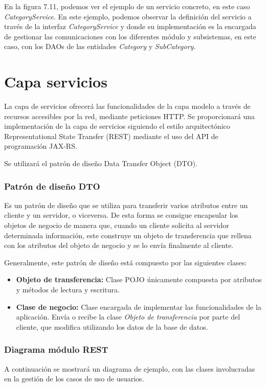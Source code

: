 En la figura 7.11, podemos ver el ejemplo de un servicio concreto, en este caso \textit{CategoryService}. En este ejemplo, podemos observar la definición del servicio a través de la interfaz \textit{CategoryService} y donde su implementación es la encargada de gestionar las comunicaciones con los diferentes módulo y subsistemas, en este caso, con los DAOs de las entidades \textit{Category} y \textit{SubCategory}.



\section{Capa servicios}
La capa de servicios ofrecerá las funcionalidades de la capa modelo a través de recursos accesibles por la red, mediante peticiones HTTP. Se proporcionará una implementación de la capa de servicios siguiendo el  estilo arquitectónico Representational State Transfer (REST) mediante el uso del API de programación JAX-RS.

Se utilizará el patrón de diseño Data Transfer Object (DTO).

\subsubsection*{Patrón de diseño DTO}
Es un patrón de diseño que se utiliza para transferir varios atributos entre un cliente y un servidor, o viceversa. De esta forma se consigue encapsular los objetos de negocio de manera que, cuando un cliente solicita al servidor determinada información, este construye un objeto de transferencia que rellena con los atributos del objeto de negocio y se lo envía finalmente al cliente.

Generalmente, este patrón de diseño está compuesto por las siguientes clases:

\begin{itemize}
	\item \textbf{Objeto de transferencia: } Clase POJO únicamente compuesta por atributos y métodos de lectura y escritura.
	\item \textbf{Clase de negocio: } Clase encargada de implementar las funcionalidades de la aplicación. Envía o recibe la clase \textit{Objeto de transferencia} por parte del cliente, que modifica utilizando los datos de la base de datos.
\end{itemize}


\subsubsection*{Diagrama módulo REST}
A continuación se mostrará un diagrama de ejemplo, con las clases involucradas en la gestión de los casos de uso de usuarios.

